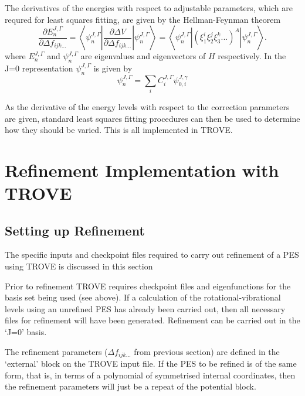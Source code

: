 The derivatives of the energies with respect to adjustable parameters, which are requred for least squares fitting, 
are given by the Hellman-Feynman theorem\cite{11Atkins.book,jt503}
\begin{equation}
 \frac{\partial E^{J,\Gamma}_{n} }{ \partial \Delta f_{ijk...} } = \left< \psi^{J,\Gamma}_{n} \left| \frac{\partial \Delta V}{\partial \Delta f_{ijk...} } 
 \right |\psi^{J,\Gamma}_{n} \right> = \left< \psi^{J,\Gamma}_{n} \left| \left(\xi_1^i \xi_2^j \xi_3^k ...\right)^A \right| \psi^{J,\Gamma}_{n} \right>.
\end{equation}
where $E^{J,\Gamma}_{n}$ and $\psi^{J,\Gamma}_{n}$ are eigenvalues and eigenvectors of $H$ respectively. 
In the J=0 representation $\psi^{J,\Gamma}_{n}$ is given by
\begin{equation}
 \psi^{J,\Gamma}_{n} = \sum_i C_i^{J, \Gamma} \psi_{0,i}^{J, \gamma}
\end{equation} 

As the derivative of the energy levels with respect to the correction parameters are given, standard least squares fitting
procedures can then be used to determine how they should be varied. This is all implemented in TROVE.



\section{Refinement Implementation with TROVE}

\subsection{Setting up Refinement}

The specific inputs and checkpoint files required to carry out refinement of a PES using TROVE is discussed in this section

Prior to refinement TROVE requires checkpoint files and eigenfunctions for the basis set being used (see above). 
If a calculation of the rotational-vibrational levels using an
unrefined PES has already been carried out, then all necessary files for refinement will have been generated. 
Refinement can be carried out in the `J=0' basis.

The refinement parameters ($\Delta f_{ijk...}$ from previous section) are defined in the `external' block on the TROVE input
 file. If the PES to be refined is of the same form,
that is, in terms of a polynomial of symmetrised internal coordinates, then the refinement parameters will just be a repeat of 
the potential block. 

